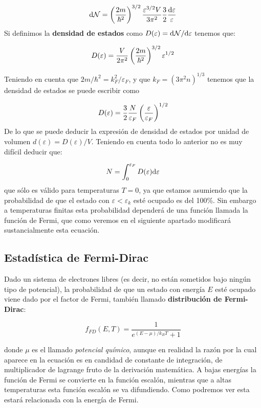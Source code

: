 \begin{equation}
	\mathrm{d} \mathcal{N} =\left( \frac{2m}{\hbar^2} \right)^{3/2} \frac{ \varepsilon^{3/2} V}{3\pi^2}\frac{3}{2} \frac{\mathrm{d} \varepsilon}{\varepsilon}
\end{equation}
Si definimos la \textbf{densidad de estados} como $D(\varepsilon) = \mathrm{d} \mathcal{N} / \mathrm{d} \varepsilon$ tenemos que:
\begin{mybox}
\begin{equation}
	D(\varepsilon) = \frac{V}{2\pi^2} \left( \frac{2m}{\hbar^2} \right)^{3/2} \varepsilon^{1/ 2}
\end{equation}
\end{mybox}
Teniendo en cuenta que $2m/\hbar^2 = k_F^2 / \varepsilon_F$, y que $k_F=(3\pi^2 n)^{1/3}$ tenemos que la densidad de estados se puede escribir como

\begin{equation}
	D(\varepsilon)  = \frac{3}{2}  \frac{N}{\varepsilon_F} \left( \frac{\varepsilon}{\varepsilon_F} \right)^{1/2}
\end{equation}
De lo que se puede deducir la expresión de densidad de estados por unidad de volumen $d(\varepsilon)=D(\varepsilon)/V$. Teniendo en cuenta todo lo anterior no es muy difícil deducir que:

\begin{equation}
	N = \int_{0}^{\varepsilon_F} D(\varepsilon) \mathrm{d} \varepsilon
\end{equation}
que sólo es válido para temperaturas $T=0$, ya que estamos asumiendo que la probabilidad de que el estado con $\varepsilon<\varepsilon_k$ esté ocupado es del 100\%. Sin embargo a temperaturas finitas esta probabilidad dependerá de una función llamada la función de Fermi, que como veremos en el siguiente apartado modificará sustancialmente esta ecuación. 

\subsection{Estadística de Fermi-Dirac}

Dado un sistema de electrones libres (es decir, no están sometidos bajo ningún tipo de potencial), la probabilidad de que un estado con energía $E$ esté ocupado viene dado por el factor de Fermi, también llamado \textbf{distribución de Fermi-Dirac}:
\begin{mybox}\begin{equation}
	f_{FD} (E,T) = \dfrac{1}{e^{(E-\mu)/k_BT}+1}
\end{equation}\end{mybox}
donde $\mu$ es el llamado \textit{potencial químico}, aunque en realidad la razón por la cual aparece en la ecuación es en candidad de constante de integración, de multiplicador de lagrange fruto de la derivación matemática. A bajas energías la función de Fermi se convierte en la función escalón, mientras que a altas temperaturas esta función escalón se va difundiendo. Como podremos ver esta estará relacionada con la energía de Fermi.

